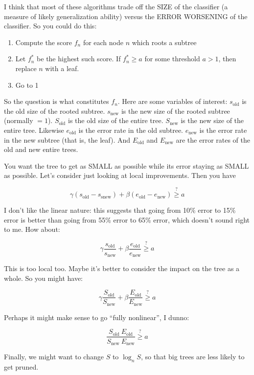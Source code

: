 \documentclass{article}
\begin{document}
I think that most of these algorithms trade off the SIZE of the classifier (a measure of likely generalization ability) versus the ERROR WORSENING of the classifier.  So you could do this:

\begin{enumerate}
\item Compute the score \(f_n\) for each node \(n\) which roots a subtree
\item Let \(f^*_n\) be the highest such score.  If \(f^*_n \geq a\) for some threshold \(a > 1\), then replace \(n\) with a leaf.
\item Go to 1
\end{enumerate}

So the question is what constitutes \(f_n\).  Here are some variables of interest:  \(s_\text{old}\) is the old size of the rooted subtree.  \(s_\text{new}\) is the new size of the rooted subtree (normally \(=1\)).  \(S_\text{old}\) is the old size of the entire tree.  \(S_\text{new}\) is the new size of the entire tree.  Likewise \(e_\text{old}\) is the error rate in the old subtree.  \(e_\text{new}\) is the error rate in the new subtree (that is, the leaf).  And \(E_\text{old}\) and \(E_\text{new}\) are the error rates of the old and new entire trees.

You want the tree to get as SMALL as possible while its error staying as SMALL as possible.  Let's consider just looking at local improvements.  Then you have 

\[
\gamma (s_\text{old} - s_\text{snew}) +  \beta (e_\text{old} - e_\text{new}) \stackrel{?}{\geq} a
\]

I don't like the linear nature: this suggests that going from 10\% error to 15\% error is better than going from 55\% error to 65\% error, which doesn't sound right to me.  How about:

\[
\gamma \frac{s_\text{old}}{s_\text{new}} + \beta \frac{e_\text{old}}{e_\text{new}} \stackrel{?}{\geq} a
\]

This is too local too.  Maybe it's better to consider the impact on the tree as a whole.  So you might have:

\[
\gamma \frac{S_\text{old}}{S_\text{new}} + \beta \frac{E_\text{old}}{E_\text{new}} \stackrel{?}{\geq} a
\]

Perhaps it might make sense to go ``fully nonlinear'', I dunno:

\[
 \frac{S_\text{old}\ E_\text{old}}{S_\text{new}\ E_\text{new}} \stackrel{?}{\geq} a
\]

Finally, we might want to change \(S\) to \(\log_n S\), so that big trees are less likely to get pruned.
\end{document}
